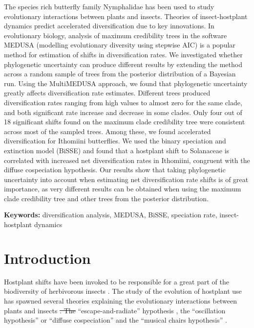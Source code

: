 \documentclass[10pt]{article}
\providecommand{\DIFaddtex}[1]{{\protect\color{blue}\uwave{#1}}} %
\providecommand{\DIFdeltex}[1]{{\protect\color{red}\sout{#1}}}                      %
\providecommand{\DIFaddbegin}{} %
\providecommand{\DIFaddend}{} %
\providecommand{\DIFdelbegin}{} %
\providecommand{\DIFdelend}{} %
\providecommand{\DIFadd}[1]{\texorpdfstring{\DIFaddtex{#1}}{#1}} %
\providecommand{\DIFdel}[1]{\texorpdfstring{\DIFdeltex{#1}}{}} %
\begin{document}
The species rich butterfly family Nymphalidae has been used to study
evolutionary interactions between plants and insects. Theories of
insect-hostplant dynamics predict accelerated diversification due to key
innovations. In evolutionary biology, analysis of maximum credibility
trees in the software MEDUSA (modelling evolutionary diversity using
stepwise AIC) is a popular method for estimation of shifts in
diversification rates. We investigated whether phylogenetic uncertainty
can produce different results by extending the method across a random
sample of trees from the posterior distribution of a Bayesian run. Using
the MultiMEDUSA approach, we found that phylogenetic uncertainty greatly
affects diversification rate estimates. Different trees produced
diversification rates ranging from high values to almost zero for the
same clade, and both significant rate increase and decrease in some
clades. Only four out of 18 significant shifts found on the maximum
clade credibility tree were consistent across most of the sampled trees.
Among these, we found accelerated diversification for Ithomiini
butterflies. We used the binary speciation and extinction model (BiSSE)
and found that a hostplant shift to Solanaceae is correlated with
increased net diversification rates in Ithomiini, congruent with the
diffuse cospeciation hypothesis. Our results show that taking
phylogenetic uncertainty into account when estimating net
diversification rate shifts is of great importance, as very different
results can be obtained when using the maximum clade credibility tree
and other trees from the posterior distribution.

\textbf{Keywords:} diversification analysis, MEDUSA, BiSSE, speciation
rate, insect-hostplant dynamics

\section*{Introduction}

Hostplant shifts have been invoked to be responsible for a great part of
the biodiversity of herbivorous insects \cite{mitter1988}. The study of the
evolution of hostplant use has spawned several theories explaining the
evolutionary interactions between plants and insects \cite{nyman2012}\DIFdelbegin \DIFdel{. The
}\DIFdelend \DIFaddbegin \DIFadd{: the
}\DIFaddend ``escape-and-radiate'' hypothesis \cite{ehrlich1964}, the ``oscillation
hypothesis'' \cite{janz2011, nylin2014} or ``diffuse cospeciation'' \cite{nyman2012} and the
``musical chairs hypothesis'' \cite{hardy2014}.
\end{document}
